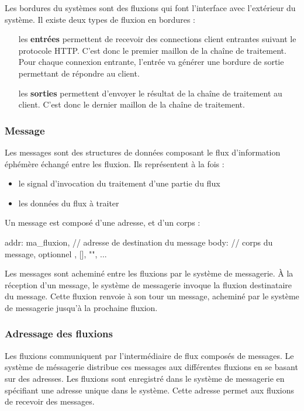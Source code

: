 	Les bordures du systèmes sont des fluxions qui font l'interface avec l'extérieur du système.
	Il existe deux types de fluxion en bordures :

	\begin{itemize}
		\item[les \textbf{entrées}]
	    permettent de recevoir des connections client entrantes suivant le protocole HTTP.
	    C'est donc le premier maillon de la chaîne de traitement.
	    Pour chaque connexion entrante, l'entrée va générer une bordure de sortie permettant de répondre au client.
		\item[les \textbf{sorties}]
	    permettent d'envoyer le résultat de la chaîne de traitement au client.
	    C'est donc le dernier maillon de la chaîne de traitement.
	\end{itemize}

	\subsubsection{Message}

	Les messages sont des structures de données composant le flux d'information éphémère échangé entre les fluxion.
	Ils représentent à la fois :

	\begin{itemize}
		\item le signal d'invocation du traitement d'une partie du flux
		\item les données du flux à traiter
	\end{itemize}

	Un message est composé d'une adresse, et d'un corps :
	\begin{code}
  {
      addr: ma_fluxion, // adresse de destination du message
      body: // corps du message, optionnel
          {}, [], "", ...
  }
  \end{code}

	Les messages sont acheminé entre les fluxions par le système de messagerie.
	À la réception d'un message, le système de messagerie invoque la fluxion destinataire du message.
	Cette fluxion renvoie à son tour un message, acheminé par le système de messagerie jusqu'à la prochaine fluxion.

	\subsubsection{Adressage des fluxions}

	Les fluxions communiquent par l'intermédiaire de flux composés de messages.
	Le système de méssagerie distribue ces messages aux différentes fluxions en se basant sur des adresses.
	Les fluxions sont enregistré dans le système de messagerie en spécifiant une adresse unique dans le système.
	Cette adresse permet aux fluxions de recevoir des messages.

